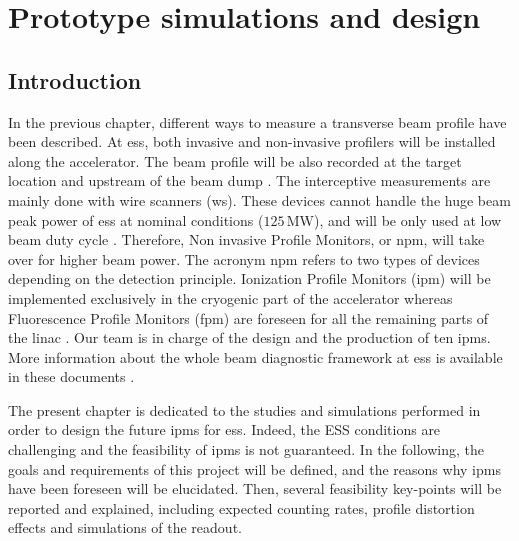 \chapter{Prototype simulations and design}
\cleardoublepage
\minitoc
\section{Introduction}
\begin{refsection}
  \label{ch3:Introduction}
  In the previous chapter, different ways to measure a transverse beam profile have been described. At \acrshort{ess}, both invasive and non-invasive profilers will be installed along the accelerator. The beam profile will be also recorded at the target location and upstream of the beam dump \cite{shea2013}. The interceptive measurements are mainly done with wire scanners (\acrshort{ws}). These devices cannot handle the huge beam peak power of \acrshort{ess} at nominal conditions ($125\,\mathrm{MW}$), and will be only used at low beam duty cycle \cite{Cheymol2013}. Therefore, Non invasive Profile Monitors, or \acrshort{npm}, will take over for higher beam power. The acronym \acrshort{npm} refers to two types of devices depending on the detection principle. Ionization Profile Monitors (\acrshort{ipm}) will be implemented exclusively in the cryogenic part of the accelerator whereas Fluorescence Profile Monitors (\acrshort{fpm}) are foreseen for all the remaining parts of the linac \cite{Thomas2016}. Our team is in charge of the design and the production of ten \acrshort{ipm}s. More information about the whole beam diagnostic framework at \acrshort{ess} is available in these documents \cite{Peggs2013,Shea:IBIC2017-MO2AB2}.

  The present chapter is dedicated to the studies and simulations performed in order to design the future \acrshort{ipm}s for \acrshort{ess}. Indeed, the ESS conditions are challenging and the feasibility of \acrshort{ipm}s is not guaranteed. In the following, the goals and requirements of this project will be defined, and the reasons why \acrshort{ipm}s have been foreseen will be elucidated. Then, several feasibility key-points will be reported and explained, including expected counting rates, profile distortion effects and simulations of the readout.


\end{refsection}
